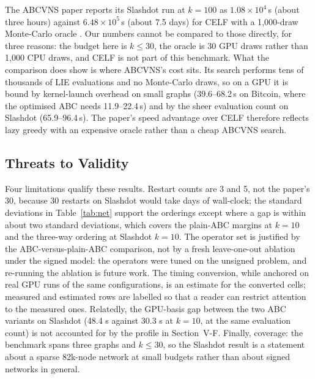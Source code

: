 \documentclass[journal,letterpaper,10pt]{IEEEtran}
\begin{document}
The ABCVNS paper reports its Slashdot run at $k=100$ as $1.08\times10^{4}$\,s (about three hours) against $6.48\times10^{5}$\,s (about 7.5 days) for CELF with a 1{,}000-draw Monte-Carlo oracle \cite{tang2026}. Our numbers cannot be compared to those directly, for three reasons: the budget here is $k\le30$, the oracle is 30 GPU draws rather than 1{,}000 CPU draws, and CELF is not part of this benchmark. What the comparison does show is where ABCVNS's cost sits. Its search performs tens of thousands of LIE evaluations and no Monte-Carlo draws, so on a GPU it is bound by kernel-launch overhead on small graphs (39.6--68.2\,s on Bitcoin, where the optimised ABC needs 11.9--22.4\,s) and by the sheer evaluation count on Slashdot (65.9--96.4\,s). The paper's speed advantage over CELF therefore reflects lazy greedy with an expensive oracle rather than a cheap ABCVNS search.

\subsection{Threats to Validity}

Four limitations qualify these results. Restart counts are 3 and 5, not the paper's 30, because 30 restarts on Slashdot would take days of wall-clock; the standard deviations in Table~\ref{tab:net} support the orderings except where a gap is within about two standard deviations, which covers the plain-ABC margins at $k=10$ and the three-way ordering at Slashdot $k=10$. The operator set is justified by the ABC-versus-plain-ABC comparison, not by a fresh leave-one-out ablation under the signed model: the operators were tuned on the unsigned problem, and re-running the ablation is future work. The timing conversion, while anchored on real GPU runs of the same configurations, is an estimate for the converted cells; measured and estimated rows are labelled so that a reader can restrict attention to the measured ones. Relatedly, the GPU-basis gap between the two ABC variants on Slashdot (48.4 s against 30.3 s at $k=10$, at the same evaluation count) is not accounted for by the profile in Section~V-F. Finally, coverage: the benchmark spans three graphs and $k\le30$, so the Slashdot result is a statement about a sparse 82k-node network at small budgets rather than about signed networks in general.
\end{document}
